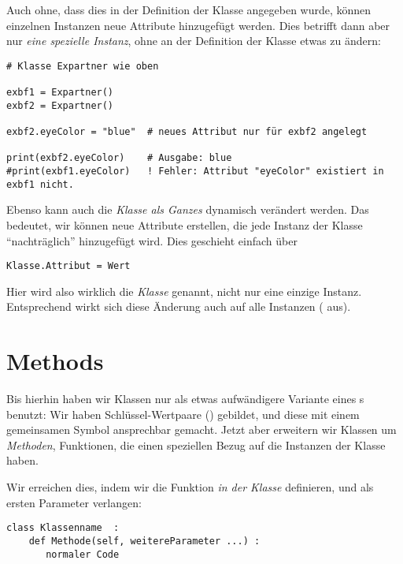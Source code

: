 Auch ohne, dass dies in der Definition der Klasse angegeben wurde, können einzelnen Instanzen neue Attribute hinzugefügt werden. Dies betrifft dann aber nur \emph{eine spezielle Instanz}, ohne an der Definition der Klasse etwas zu ändern:
\begin{codebox}
\begin{verbatim}
# Klasse Expartner wie oben

exbf1 = Expartner()
exbf2 = Expartner()

exbf2.eyeColor = "blue"  # neues Attribut nur für exbf2 angelegt

print(exbf2.eyeColor)    # Ausgabe: blue
#print(exbf1.eyeColor)   ! Fehler: Attribut "eyeColor" existiert in exbf1 nicht.
\end{verbatim}
\end{codebox}

Ebenso kann auch die \emph{Klasse als Ganzes} dynamisch verändert werden. Das bedeutet, wir können neue Attribute erstellen, die jede Instanz der Klasse \enquote{nachträglich} hinzugefügt wird. Dies geschieht einfach über
\begin{codebox}
\begin{verbatim}
Klasse.Attribut = Wert
\end{verbatim}
\end{codebox}

Hier wird also wirklich die \emph{Klasse} genannt, nicht nur eine einzige Instanz. Entsprechend wirkt sich diese Änderung auch auf alle Instanzen (\eg {} aus).

\section{Methods}
Bis hierhin haben wir Klassen nur als etwas aufwändigere Variante eines s benutzt: Wir haben Schlüssel-Wertpaare (\eg {}) gebildet, und diese mit einem gemeinsamen Symbol ansprechbar gemacht. Jetzt aber erweitern wir Klassen um \emph{Methoden}, \ie Funktionen, die einen speziellen Bezug auf die Instanzen der Klasse haben.

Wir erreichen dies, indem wir die Funktion \emph{in der Klasse} definieren, und als ersten Parameter  verlangen:
\begin{codebox}
\begin{verbatim}
class Klassenname  :
    def Methode(self, weitereParameter ...) :
       normaler Code
\end{verbatim}
\end{codebox}

